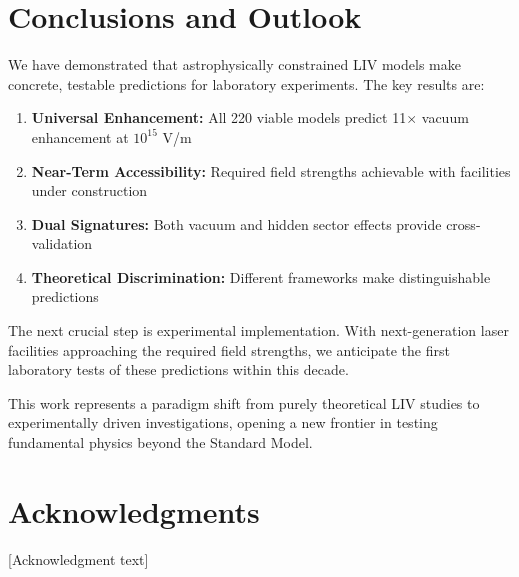 \documentclass[12pt]{article}
\begin{document}
\section{Conclusions and Outlook}

We have demonstrated that astrophysically constrained LIV models make concrete, testable predictions for laboratory experiments. The key results are:

\begin{enumerate}
\item \textbf{Universal Enhancement:} All 220 viable models predict 11$\times$ vacuum enhancement at $10^{15}$ V/m

\item \textbf{Near-Term Accessibility:} Required field strengths achievable with facilities under construction

\item \textbf{Dual Signatures:} Both vacuum and hidden sector effects provide cross-validation

\item \textbf{Theoretical Discrimination:} Different frameworks make distinguishable predictions
\end{enumerate}

The next crucial step is experimental implementation. With next-generation laser facilities approaching the required field strengths, we anticipate the first laboratory tests of these predictions within this decade.

This work represents a paradigm shift from purely theoretical LIV studies to experimentally driven investigations, opening a new frontier in testing fundamental physics beyond the Standard Model.

\section*{Acknowledgments}

[Acknowledgment text]



\end{document}
